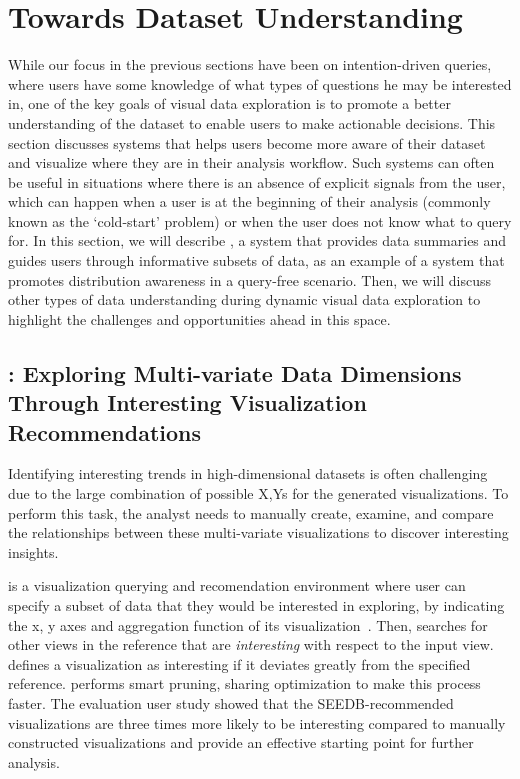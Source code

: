 \section{Towards Dataset Understanding}\label{sec:minimal}
\par While our focus in the previous sections have been on intention-driven queries, where users have some knowledge of what types of questions he may be interested in, one of the key goals of visual data exploration is to promote a better understanding of the dataset to enable users to make actionable decisions. This section discusses systems that helps users become more aware of their dataset and visualize where they are in their analysis workflow. Such systems can often be useful in situations where there is an absence of explicit signals from the user, which can happen when a user is at the beginning of their analysis (commonly known as the `cold-start' problem) or when the user does not know what to query for. In this section, we will describe \sbd, a system that provides data summaries and guides users through informative subsets of data, as an example of a system that promotes distribution awareness in a query-free scenario. Then, we will discuss other types of data understanding during dynamic visual data exploration to highlight the challenges and opportunities ahead in this space.
\subsection{\seedb: Exploring Multi-variate Data Dimensions Through Interesting Visualization Recommendations}
\par Identifying interesting trends in high-dimensional datasets is often challenging due to the large combination of possible X,Ys for the generated visualizations. To perform this task, the analyst needs to manually create, examine, and compare the relationships between these multi-variate visualizations to discover interesting insights. 
\par \seedb is a visualization querying and recomendation environment where user can specify a subset of data that they would be interested in exploring, by indicating the x, y axes and aggregation function of its visualization~\cite{Vartak2015}. Then, \seedb searches for other views in the reference that are \textit{interesting} with respect to the input view. \seedb defines a visualization as interesting if it deviates greatly from the specified reference. \seedb performs smart pruning, sharing optimization to make this process faster. The evaluation user study showed that the SEEDB-recommended visualizations are three times more likely to be interesting compared to manually constructed visualizations and provide an effective starting point for further analysis.
